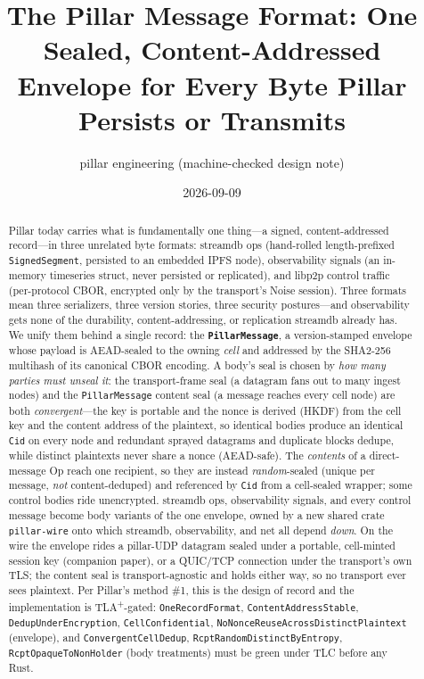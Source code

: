 \documentclass[10pt,twocolumn]{article}
\title{\vspace{-3.5em}\bfseries The Pillar Message Format: One Sealed,
Content-Addressed Envelope for Every Byte Pillar Persists or Transmits}
\author{\normalsize pillar engineering \quad(machine-checked design note)}
\date{\normalsize 2026-09-09}
\newcommand{\code}[1]{\texttt{\small #1}}
\newcommand{\Cid}{\code{Cid}}
\begin{document}
\maketitle

\begin{abstract}
\noindent
Pillar today carries what is fundamentally one thing---a signed,
content-addressed record---in three unrelated byte formats: streamdb ops
(hand-rolled length-prefixed \code{SignedSegment}, persisted to an embedded IPFS
node), observability signals (an in-memory timeseries struct, never persisted or
replicated), and libp2p control traffic (per-protocol CBOR, encrypted only by the
transport's Noise session). Three formats mean three serializers, three version
stories, three security postures---and observability gets none of the durability,
content-addressing, or replication streamdb already has. We unify them behind a
single record: the \textbf{\code{PillarMessage}}, a version-stamped envelope whose
payload is AEAD-sealed to the owning \emph{cell} and addressed by the SHA2-256
multihash of its canonical CBOR encoding. A body's seal is chosen by \emph{how many
parties must unseal it}: the transport-frame seal (a datagram fans out to many ingest
nodes) and the \code{PillarMessage} content seal (a message reaches every cell node)
are both \emph{convergent}---the key is portable and the nonce is derived (HKDF) from
the cell key and the content address of the plaintext, so identical bodies produce an
identical \Cid{} on every node and redundant sprayed datagrams and duplicate blocks
dedupe, while distinct plaintexts never share a nonce (AEAD-safe). The \emph{contents}
of a direct-message Op reach one recipient, so they are instead \emph{random}-sealed
(unique per message, \emph{not} content-deduped) and referenced by \Cid{} from a
cell-sealed wrapper; some control bodies ride unencrypted. streamdb
ops, observability signals, and every control message become body variants of the
one envelope, owned by a new shared crate \code{pillar-wire} onto which streamdb,
observability, and net all depend \emph{down}. On the wire the envelope rides a
pillar-UDP datagram sealed under a portable, cell-minted session key (companion
paper), or a QUIC/TCP connection under the transport's own TLS; the content seal
is transport-agnostic and holds either way, so no transport ever sees plaintext.
Per Pillar's method \#1, this is the design of record and the implementation is
TLA\textsuperscript{+}-gated: \code{OneRecordFormat}, \code{ContentAddressStable},
\code{DedupUnderEncryption}, \code{CellConfidential},
\code{NoNonceReuseAcrossDistinctPlaintext} (envelope), and
\code{Convergent\-CellDedup}, \code{RcptRandomDistinctByEntropy},
\code{RcptOpaqueToNonHolder} (body treatments) must be green under TLC before any Rust.
\end{abstract}
\end{document}
